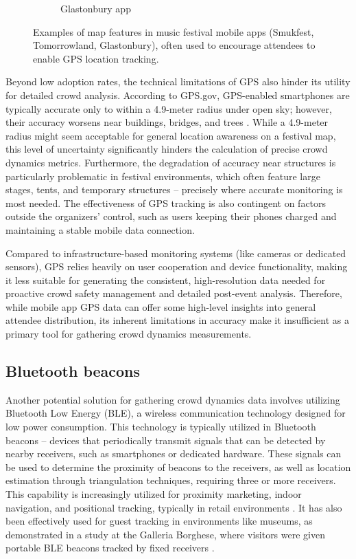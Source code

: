 \begin{figure}
\begin{subfigure}{.3\textwidth}
    \caption{Glastonbury app \cite{glastonbury_app}}
    \label{fig:glastonbury_app}
  \end{subfigure}
  \caption{Examples of map features in music festival mobile apps (Smukfest, Tomorrowland, Glastonbury), often used to encourage attendees to enable GPS location tracking.}
  \label{fig:festival_apps}
\end{figure}


Beyond low adoption rates, the technical limitations of GPS also hinder its utility for detailed crowd analysis. According to GPS.gov, GPS-enabled smartphones are typically accurate only to within a 4.9-meter radius under open sky; however, their accuracy worsens near buildings, bridges, and trees \cite{gps}. While a 4.9-meter radius might seem acceptable for general location awareness on a festival map, this level of uncertainty significantly hinders the calculation of precise crowd dynamics metrics. Furthermore, the degradation of accuracy near structures is particularly problematic in festival environments, which often feature large stages, tents, and temporary structures -- precisely where accurate monitoring is most needed. The effectiveness of GPS tracking is also contingent on factors outside the organizers' control, such as users keeping their phones charged and maintaining a stable mobile data connection.

Compared to infrastructure-based monitoring systems (like cameras or dedicated sensors), GPS relies heavily on user cooperation and device functionality, making it less suitable for generating the consistent, high-resolution data needed for proactive crowd safety management and detailed post-event analysis. Therefore, while mobile app GPS data can offer some high-level insights into general attendee distribution, its inherent limitations in accuracy make it insufficient as a primary tool for gathering crowd dynamics measurements.

\subsection{Bluetooth beacons}
Another potential solution for gathering crowd dynamics data involves utilizing Bluetooth Low Energy (BLE), a wireless communication technology designed for low power consumption. This technology is typically utilized in Bluetooth beacons -- devices that periodically transmit signals that can be detected by nearby receivers, such as smartphones or dedicated hardware. These signals can be used to determine the proximity of beacons to the receivers, as well as location estimation through triangulation techniques, requiring three or more receivers. This capability is increasingly utilized for proximity marketing, indoor navigation, and positional tracking, typically in retail environments \cite{bt_beacon}. It has also been effectively used for guest tracking in environments like museums, as demonstrated in a study at the Galleria Borghese, where visitors were given portable BLE beacons tracked by fixed receivers \cite{borghese}.

